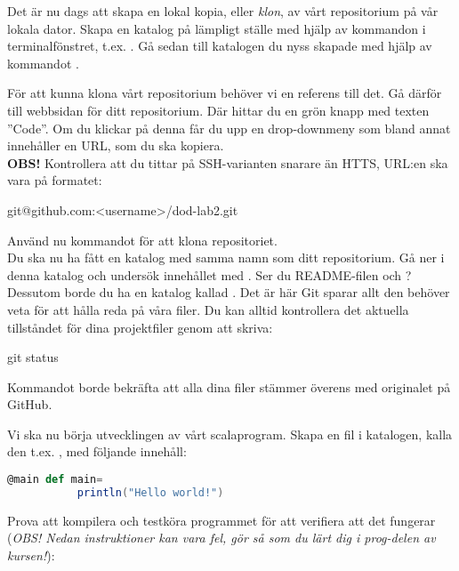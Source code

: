 \begin{Datorarbete}
	\item Det är nu dags att skapa en lokal kopia, eller \emph{klon}, av vårt repositorium på vår lokala dator. Skapa en katalog på lämpligt ställe med hjälp av kommandon i terminalfönstret, t.ex. . Gå sedan till katalogen du nyss skapade med hjälp av kommandot .

	För att kunna klona vårt repositorium behöver vi en referens till det. Gå därför till webbsidan för ditt repositorium. Där hittar du en grön knapp med texten ''Code''. Om du klickar på denna får du upp en drop-downmeny som bland annat innehåller en URL, som du ska kopiera.
	\\


	\textbf{OBS!} Kontrollera att du tittar på SSH-varianten snarare än HTTS, URL:en ska vara på formatet:
	\vspace{-.5em}
	\begin{Code}
		git@github.com:<username>/dod-lab2.git
	\end{Code}
	\vspace{.5em}

	\code{[\ref{git-clone}]} Använd nu kommandot  för att klona repositoriet.
	\\

	Du ska nu ha fått en katalog med samma namn som ditt repositorium. Gå ner i denna katalog och undersök innehållet med . Ser du README-filen och ? Dessutom borde du ha en katalog kallad . Det är här Git sparar allt den behöver veta för att hålla reda på våra filer.
	Du kan alltid kontrollera det aktuella tillståndet för dina projektfiler genom att skriva:

	\begin{Code}
		git status
	\end{Code}

	Kommandot borde bekräfta att alla dina filer stämmer överens med originalet på GitHub.

	\item Vi ska nu börja utvecklingen av vårt scalaprogram. Skapa en fil i katalogen, kalla den t.ex. , med följande innehåll:

	\begin{lstlisting}[language=scala]
		@main def main=
 		   println("Hello world!")
	\end{lstlisting}

	Prova att kompilera och testköra programmet för att verifiera att det fungerar (\emph{OBS! Nedan instruktioner kan vara fel, gör så som du lärt dig i prog-delen av kursen!}):


\end{Datorarbete}
